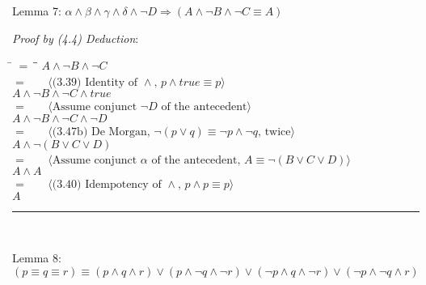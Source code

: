 \documentclass[12pt, fleqn, leqno]{article}
\newcommand{\lgap}{2pt}                             %
\newcommand{\mymathindent}{24pt}                    %
\newcommand{\impl}{\ensuremath{\Rightarrow}}        %
\newcommand{\myqed}{\rule[-.23ex]{1.2ex}{2.0ex}}
\newcommand{\myqedtab}{\hspace{384pt}}              %
\newcommand{\Gll} {\langle}                         %
\newcommand{\Ggg} {\rangle}                         %
\newcommand{\Hint}[1]     {\ \ \ $\Gll              \mbox{#1} \Ggg$ }   %
\begin{document}
Lemma 7: $\alpha \land \beta \land \gamma \land \delta \land \lnot D \impl (A \land \lnot B \land \lnot C \equiv A)$

\textit{Proof by (4.4) Deduction}:
\begin{tabbing}
\hspace{\mymathindent} \= $= \;$ \= \myqedtab \= \kill
	\> \>  $A \land  \lnot B \land \lnot C$\\
	\> $=$  \>  \Hint{(3.39) Identity of $\land$, $p \land true \equiv p$}\\[\lgap]
	\> \>   $A \land \lnot B \land \lnot C \land true$\\
	\> $=$  \>  \Hint{Assume conjunct $\lnot D$ of the antecedent}\\[\lgap]
	\> \>   $A \land \lnot B \land \lnot C \land \lnot D$\\
	\> $=$  \>  \Hint{(3.47b) De Morgan, $\lnot (p \lor q) \equiv \lnot p \land \lnot q$, twice}\\[\lgap]
	\> \>   $A \land \lnot (B \lor C \lor D)$\\
	\> $=$  \>  \Hint{Assume conjunct $\alpha$ of the antecedent, $A \equiv \lnot (B \lor C \lor D)$}\\[\lgap]
	\> \>   $A \land A$\\
	\> $=$  \>  \Hint{(3.40) Idempotency of $\land$, $p \land p \equiv p$}\\[\lgap]
	\> \>   $A$ \quad \myqed\\
\end{tabbing}

Lemma 8: $(p \equiv q \equiv r) \equiv (p \land q \land r) \lor (p \land \lnot q \land \lnot r) \lor (\lnot p \land q \land \lnot r) \lor (\lnot p \land \lnot q \land r)$
\end{document}

